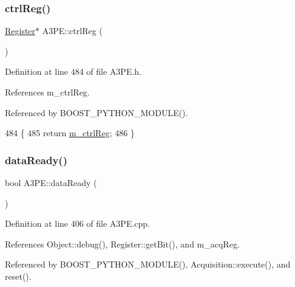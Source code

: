 \subsubsection{\texorpdfstring{ctrl\+Reg()}{ctrlReg()}}
{\footnotesize\ttfamily \hyperlink{classRegister}{Register}$\ast$ A3\+P\+E\+::ctrl\+Reg (\begin{DoxyParamCaption}{ }\end{DoxyParamCaption})\hspace{0.3cm}{\ttfamily [inline]}}



Definition at line 484 of file A3\+P\+E.\+h.



References m\+\_\+ctrl\+Reg.



Referenced by B\+O\+O\+S\+T\+\_\+\+P\+Y\+T\+H\+O\+N\+\_\+\+M\+O\+D\+U\+L\+E().


\begin{DoxyCode}
484                      \{
485     \textcolor{keywordflow}{return} \hyperlink{classA3PE_a264834484dd6326ebad58c2a3e1be9a6}{m\_ctrlReg};
486   \}
\end{DoxyCode}
\mbox{\label{classA3PE_a55df064c578bbc1e80a3b5fc05933f27}} 
\subsubsection{\texorpdfstring{data\+Ready()}{dataReady()}}
{\footnotesize\ttfamily bool A3\+P\+E\+::data\+Ready (\begin{DoxyParamCaption}{ }\end{DoxyParamCaption})}



Definition at line 406 of file A3\+P\+E.\+cpp.



References Object\+::debug(), Register\+::get\+Bit(), and m\+\_\+acq\+Reg.



Referenced by B\+O\+O\+S\+T\+\_\+\+P\+Y\+T\+H\+O\+N\+\_\+\+M\+O\+D\+U\+L\+E(), Acquisition\+::execute(), and reset().


